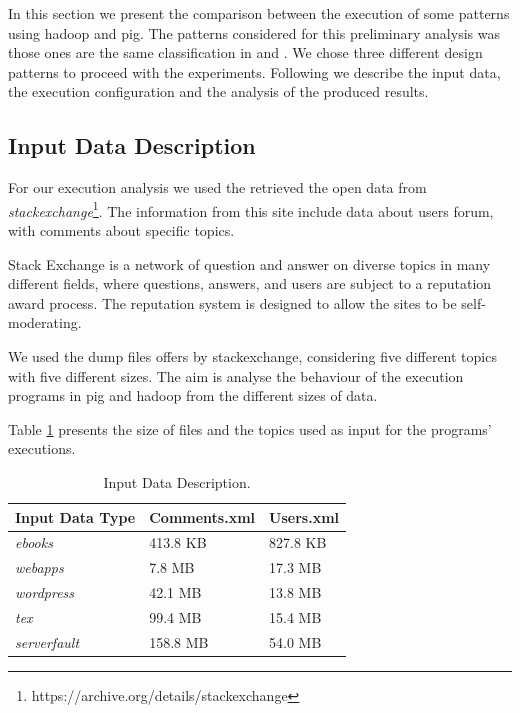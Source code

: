 In this section we present the comparison between the execution of some patterns
using hadoop and pig. The patterns considered for this preliminary analysis was
those ones are the same classification in \cite{White:2012} and
\cite{pig-designpattern:2014}. We chose three different design patterns to
proceed with the experiments. Following we describe the input data, the
execution configuration and the analysis of the produced results. 

\subsection{Input Data Description}
 
For our execution analysis we used the retrieved the open data from
\textit{stackexchange}\footnote{https://archive.org/details/stackexchange}. The
information from this site include data about users forum, with comments
about specific topics. 

Stack Exchange is a network of question and answer on diverse topics in
many different fields, where questions, answers, and users are subject to a
reputation award process. The reputation system is designed to allow the sites
to be self-moderating.


We used the dump files offers by stackexchange, considering five different
topics with five different sizes. The aim is analyse the behaviour of
the execution programs in pig and hadoop from the different sizes of
data. 

Table \ref{table:input-data-length} presents the size of files and the topics
used as input for the programs' executions. 







\begin{table}\centering \small
\begin{tabular}{|l|l|l|} \hline
\textbf{Input Data Type}		& \textbf{Comments.xml} & \textbf{Users.xml}  \\
\hline\hline 
\textit{ebooks}			&   413.8 KB    &      827.8 KB				\\ \hline
\textit{webapps}		&   7.8 MB	    &      17.3 MB 				\\ \hline
\textit{wordpress}		&   42.1 MB	    &      13.8 MB				\\ \hline
\textit{tex}			&   99.4 MB 	&      15.4 MB			 	\\ \hline
\textit{serverfault}	&   158.8 MB	&      54.0 MB				\\ \hline
  
\end{tabular}
\caption{\label{table:input-data-length} Input Data Description.}
\end{table}
 
